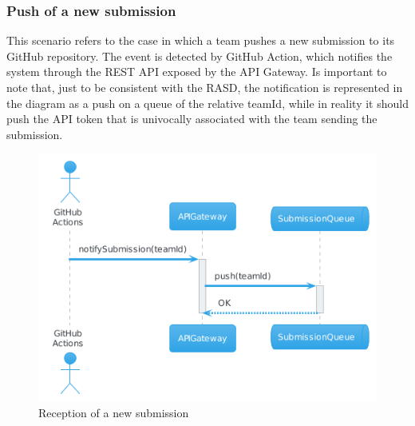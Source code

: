 \subsubsection{Push of a new submission}
This scenario refers to the case in which a team pushes a new submission to its GitHub repository. The event is detected by GitHub Action, which notifies the system through the REST API exposed by the API Gateway. Is important to note that, just to be consistent with the RASD, the notification is represented in the diagram as a push on a queue of the relative teamId, while in reality it should push the API token that is univocally associated with the team sending the submission.
\begin{figure}[H]
    \includegraphics[width=1\textwidth]{Diagrams/sequence/new_submission.png}
    \caption{Reception of a new submission}
\end{figure}

\newpage
